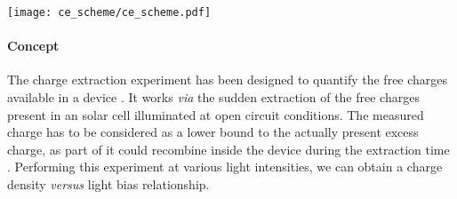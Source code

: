 \begin{SCfigure}
	\centering
	\texttt{[image: ce\_scheme/ce\_scheme.pdf]}
	\label{fig:ce_scheme}
\end{SCfigure}


	\paragraph{Concept}
	The charge extraction experiment has been designed to quantify the free charges available in a device \cite{Duffy2000,Barnes2011}.
	It works \textsl{via} the sudden extraction of the free charges present in an solar cell illuminated at open circuit conditions.
	The measured charge has to be considered as a lower bound to the actually present excess charge, as part of it could recombine inside the device during the extraction time \cite{ORegan2005}.
	Performing this experiment at various light intensities, we can obtain a charge density \textsl{versus} light bias relationship.

